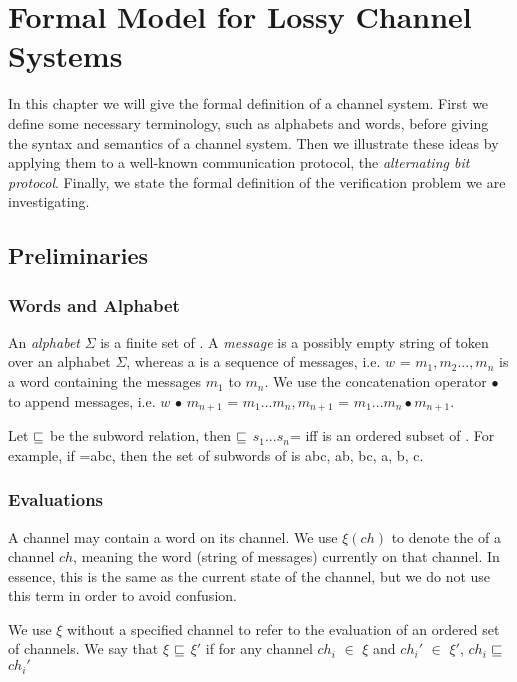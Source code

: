 \section{Formal Model for Lossy Channel Systems}
\label{definitions}
In this chapter we will give the formal definition of a channel system. First we define some necessary terminology, such as alphabets and words, before giving the syntax and semantics of a channel system. Then we illustrate these ideas by applying them to a well-known communication protocol, the \emph{alternating bit protocol}. Finally, we state the formal definition of the verification problem we are investigating.

\subsection{Preliminaries}
\subsubsection{Words and Alphabet}
An \emph{alphabet} $\Sigma$ is a finite set of . A \emph{message} is a possibly empty string of token over an alphabet $\Sigma$, whereas a  is a sequence of messages, i.e. $w$ = $m_1, m_2..., m_n$ is a word containing the messages $m_1$ to $m_n$. We use the concatenation operator $\bullet$ to append messages, i.e. $w$ $\bullet$ $m_{n+1}$ = $m_1...m_n,m_{n+1}$ = $m_1...m_n \bullet m_{n+1}$.


Let $\sqsubseteq$ be the subword relation, then  $\sqsubseteq$ $s_1...s_n$= iff  is an ordered subset of . For example, if =abc, then the set of subwords of  is {abc, ab, bc, a, b, c}.

\subsubsection{Evaluations}
A channel may contain a word on its channel. We use $\xi(ch)$ to denote the  of a channel $ch$, meaning the word (string of messages) currently on that channel. In essence, this is the same as the current state of the channel, but we do not use this term in order to avoid confusion.

We use $\xi$ without a specified channel to refer to the evaluation of an ordered set of channels. We say that $\xi$ $\sqsubseteq$ $\xi'$ if for any channel $ch_i$ $\in$ $\xi$ and $ch_i'$ $\in$ $\xi'$, $ch_i$ $\sqsubseteq$ $ch_i'$

